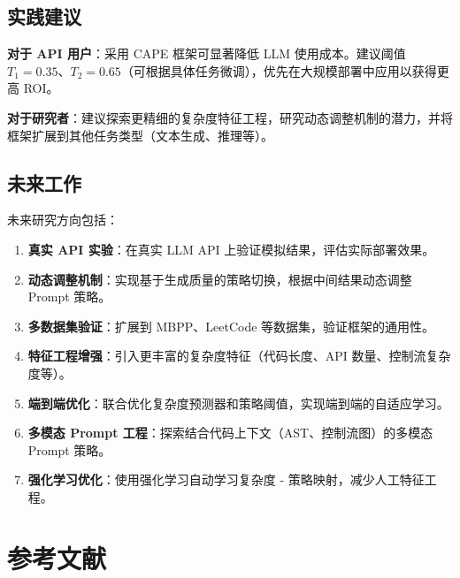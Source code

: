\documentclass[11pt,a4paper]{article}
\begin{document}
\subsection{实践建议}

\textbf{对于 API 用户}：采用 CAPE 框架可显著降低 LLM 使用成本。建议阈值 $T_1=0.35$、$T_2=0.65$（可根据具体任务微调），优先在大规模部署中应用以获得更高 ROI。

\textbf{对于研究者}：建议探索更精细的复杂度特征工程，研究动态调整机制的潜力，并将框架扩展到其他任务类型（文本生成、推理等）。

\subsection{未来工作}

未来研究方向包括：

\begin{enumerate}[leftmargin=*]
    \item \textbf{真实 API 实验}：在真实 LLM API 上验证模拟结果，评估实际部署效果。
    
    \item \textbf{动态调整机制}：实现基于生成质量的策略切换，根据中间结果动态调整 Prompt 策略。
    
    \item \textbf{多数据集验证}：扩展到 MBPP、LeetCode 等数据集，验证框架的通用性。
    
    \item \textbf{特征工程增强}：引入更丰富的复杂度特征（代码长度、API 数量、控制流复杂度等）。
    
    \item \textbf{端到端优化}：联合优化复杂度预测器和策略阈值，实现端到端的自适应学习。
    
    \item \textbf{多模态 Prompt 工程}：探索结合代码上下文（AST、控制流图）的多模态 Prompt 策略。
    
    \item \textbf{强化学习优化}：使用强化学习自动学习复杂度 - 策略映射，减少人工特征工程。
\end{enumerate}

\section*{参考文献}
\end{document}
